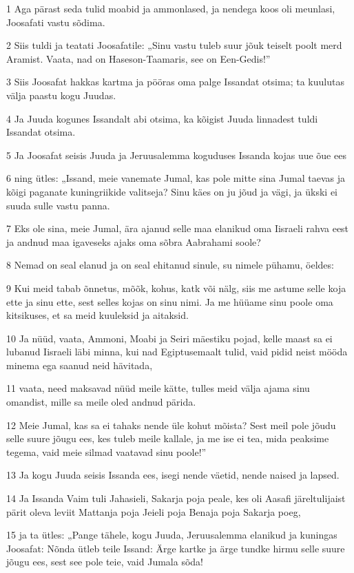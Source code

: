 \par 1 Aga pärast seda tulid moabid ja ammonlased, ja nendega koos oli meunlasi, Joosafati vastu sõdima.
\par 2 Siis tuldi ja teatati Joosafatile: „Sinu vastu tuleb suur jõuk teiselt poolt merd Aramist. Vaata, nad on Haseson-Taamaris, see on Een-Gedis!”
\par 3 Siis Joosafat hakkas kartma ja pööras oma palge Issandat otsima; ta kuulutas välja paastu kogu Juudas.
\par 4 Ja Juuda kogunes Issandalt abi otsima, ka kõigist Juuda linnadest tuldi Issandat otsima.
\par 5 Ja Joosafat seisis Juuda ja Jeruusalemma koguduses Issanda kojas uue õue ees
\par 6 ning ütles: „Issand, meie vanemate Jumal, kas pole mitte sina Jumal taevas ja kõigi paganate kuningriikide valitseja? Sinu käes on ju jõud ja vägi, ja ükski ei suuda sulle vastu panna.
\par 7 Eks ole sina, meie Jumal, ära ajanud selle maa elanikud oma Iisraeli rahva eest ja andnud maa igaveseks ajaks oma sõbra Aabrahami soole?
\par 8 Nemad on seal elanud ja on seal ehitanud sinule, su nimele pühamu, öeldes:
\par 9 Kui meid tabab õnnetus, mõõk, kohus, katk või nälg, siis me astume selle koja ette ja sinu ette, sest selles kojas on sinu nimi. Ja me hüüame sinu poole oma kitsikuses, et sa meid kuuleksid ja aitaksid.
\par 10 Ja nüüd, vaata, Ammoni, Moabi ja Seiri mäestiku pojad, kelle maast sa ei lubanud Iisraeli läbi minna, kui nad Egiptusemaalt tulid, vaid pidid neist mööda minema ega saanud neid hävitada,
\par 11 vaata, need maksavad nüüd meile kätte, tulles meid välja ajama sinu omandist, mille sa meile oled andnud pärida.
\par 12 Meie Jumal, kas sa ei tahaks nende üle kohut mõista? Sest meil pole jõudu selle suure jõugu ees, kes tuleb meile kallale, ja me ise ei tea, mida peaksime tegema, vaid meie silmad vaatavad sinu poole!”
\par 13 Ja kogu Juuda seisis Issanda ees, isegi nende väetid, nende naised ja lapsed.
\par 14 Ja Issanda Vaim tuli Jahasieli, Sakarja poja peale, kes oli Aasafi järeltulijaist pärit oleva leviit Mattanja poja Jeieli poja Benaja poja Sakarja poeg,
\par 15 ja ta ütles: „Pange tähele, kogu Juuda, Jeruusalemma elanikud ja kuningas Joosafat: Nõnda ütleb teile Issand: Ärge kartke ja ärge tundke hirmu selle suure jõugu ees, sest see pole teie, vaid Jumala sõda!
